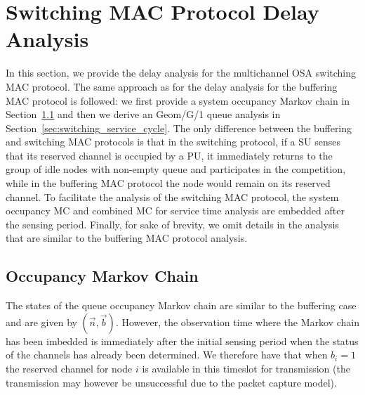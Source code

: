 \documentclass[12pt,journal,oneside,onecolumn]{IEEEtran}
\begin{document}
\section{Switching MAC Protocol Delay Analysis}
\label{sec:switching}

In this section, we provide the delay analysis for the multichannel OSA switching MAC protocol. 
The same approach as for the delay analysis for the buffering MAC protocol is followed: we first 
provide a system occupancy Markov chain in Section~\ref{sec:switching_occ_mc} and then we derive an Geom/G/1 queue analysis 
in Section~\ref{sec:switching_service_cycle}. 
The only difference between the buffering and switching MAC protocols is that in the switching protocol, if a SU senses that its reserved channel is occupied
by a PU, it immediately returns to the group of idle nodes with non-empty queue and participates in the competition, while in the buffering MAC protocol
the node would remain on its reserved channel. To facilitate the analysis of the switching MAC protocol, the system occupancy MC and combined MC for service time analysis
are embedded after the sensing period. Finally, for
sake of brevity, we omit details in the analysis that are similar to the buffering MAC protocol analysis.





\subsection{Occupancy Markov Chain}
\label{sec:switching_occ_mc}

The states of the queue occupancy Markov chain are similar 
to the buffering case and are given by $(\vec{n},\vec{b})$. 
However, the observation time where the Markov chain has been 
imbedded is immediately after the initial sensing period when 
the status of the channels has already been determined. 
We therefore have that when $b_i=1$ the reserved channel for node $i$
is available in this timeslot for transmission (the transmission may however be unsuccessful due to the packet capture model).
\end{document}
